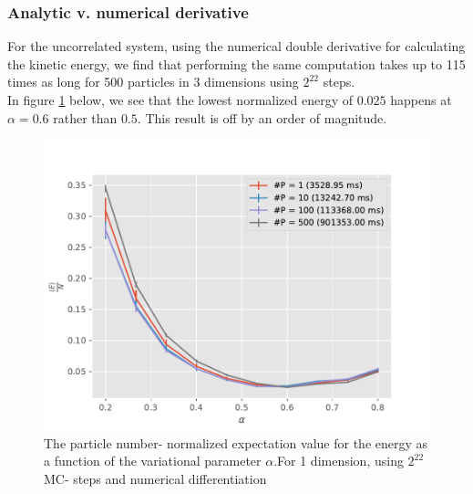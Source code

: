 \documentclass[11pt,a4paper,titlepage]{article}
\begin{document}
\subsubsection{Analytic v. numerical derivative}
For the uncorrelated system, using the numerical double derivative for calculating the kinetic energy, we find that performing the same computation takes up to 115 times as long for 500 particles in 3 dimensions using $2^{22}$ steps.\\In figure \ref{1dNumeric} below, we see that the lowest normalized energy of $0.025$ happens at $\alpha = 0.6$ rather than $0.5$. This result is off by an order of magnitude.

\begin{figure}[H]
\centering

\includegraphics[trim=0cm 0.0cm 0cm 1.0cm, clip=true,scale = 0.7]{HarmonicOscillator_SimpleGaussianNumerical_D1_2pow22_numerical_NoTitle.pdf}
\caption[Numerical No interaction (1D)]{The particle number- normalized expectation value for the energy as a function of the variational parameter $\alpha$.For 1 dimension, using $2^{22}$ MC- steps and numerical differentiation}\label{1dNumeric}
\end{figure}
\end{document}
